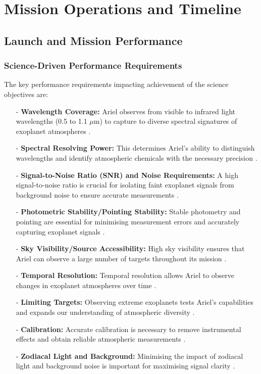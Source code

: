\documentclass[12pt]{article}
\begin{document}
\newpage

\section{Mission Operations and Timeline} \label{sec:2}

\subsection{Launch and Mission Performance} \label{sec:2.1}

\subsubsection{Science-Driven Performance Requirements} \label{sec:2.1.1}

The key performance requirements impacting achievement of the science objectives are:

\begin{itemize}
    \item[-] \textbf{Wavelength Coverage:} Ariel observes from visible to infrared light wavelengths (0.5 to 1.1 $\mu$m) to capture to diverse spectral signatures of exoplanet atmospheres \cite{salvignol2024ariel}.
    \item[-] \textbf{Spectral Resolving Power:} This determines Ariel's ability to distinguish wavelengths and identify atmospheric chemicals with the necessary precision \cite{salvignol2024ariel}.
    \item[-] \textbf{Signal-to-Noise Ratio (SNR) and Noise Requirements:} A high signal-to-noise ratio is crucial for isolating faint exoplanet signals from background noise to ensure accurate measurements \cite{salvignol2024ariel}.
    \item[-] \textbf{Photometric Stability/Pointing Stability:} Stable photometry and pointing are essential for minimising measurement errors and accurately capturing exoplanet signals \cite{salvignol2024ariel}.
    \item[-] \textbf{Sky Visibility/Source Accessibility:} High sky visibility ensures that Ariel can observe a large number of targets throughout its mission \cite{salvignol2024ariel}.
    \item[-] \textbf{Temporal Resolution:} Temporal resolution allows Ariel to observe changes in exoplanet atmospheres over time \cite{salvignol2024ariel}.
    \item[-] \textbf{Limiting Targets:} Observing extreme exoplanets tests Ariel's capabilities and expands our understanding of atmospheric diversity \cite{salvignol2024ariel}.
    \item[-] \textbf{Calibration:} Accurate calibration is necessary to remove instrumental effects and obtain reliable atmospheric measurements \cite{salvignol2024ariel}.
    \item[-] \textbf{Zodiacal Light and Background:} Minimising the impact of zodiacal light and background noise is important for maximising signal clarity \cite{salvignol2024ariel}.
\end{itemize}
\end{document}
